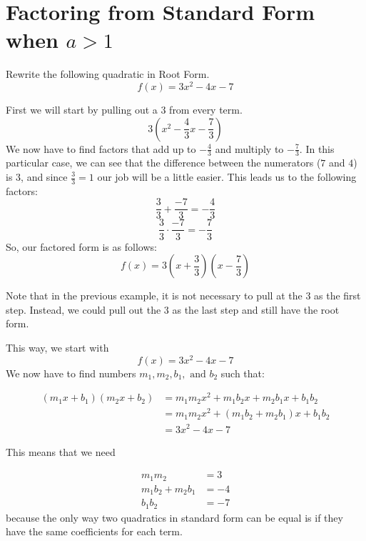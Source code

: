\documentclass{ximera}
\begin{document}
\section{Factoring from Standard Form when $a>1$}
\begin{example}
Rewrite the following quadratic in Root Form.
\[
f(x)= 3x^2-4x-7
\]
\begin{explanation}
First we will start by pulling out a $3$ from every term.
\[
3\left(x^2-\frac{4}{3}x-\frac{7}{3}\right)
\]
We now have to find factors that add up to $-\frac{4}{3}$ and multiply to $-\frac{7}{3}$. In this particular case, we can see that the difference between the numerators ($7$ and $4$) is $3$, and since $\frac{3}{3}=1$ our job will be a little easier. This leads us to the following factors:
\[
\frac{3}{3}+\frac{-7}{3}=-\frac{4}{3}
\]
\[
\frac{3}{3}\cdot \frac{-7}{3}= -\frac{7}{3}
\]
So, our factored form is as follows:
\[
f(x) = 3\left(x+\frac{3}{3}\right)\left(x-\frac{7}{3}\right)
\]
\end{explanation}

Note that in the previous example, it is not necessary to pull at the $3$ as the first step.  Instead, we could pull out the $3$ as the last step and still have the root form.

\begin{explanation}
This way, we start with
\[
f(x)= 3x^2-4x-7
\]
We now have to find numbers $m_1,m_2,b_1, \text{ and } b_2$ such that:

\begin{align*}
(m_1x+b_1)(m_2x+b_2)&=m_1m_2x^2+m_1b_2x+m_2b_1x+b_1b_2\\
				&=m_1m_2x^2+(m_1b_2+m_2b_1)x+b_1b_2\\
				&= 3x^2-4x-7
\end{align*}

This means that we need

\begin{align*}
m_1m_2&=3\\
m_1b_2+m_2b_1&=-4\\
b_1b_2&=-7
\end{align*}
because the only way two quadratics in standard form can be equal is if they have the same coefficients for each term.


\end{explanation}
\end{example}
\end{document}
